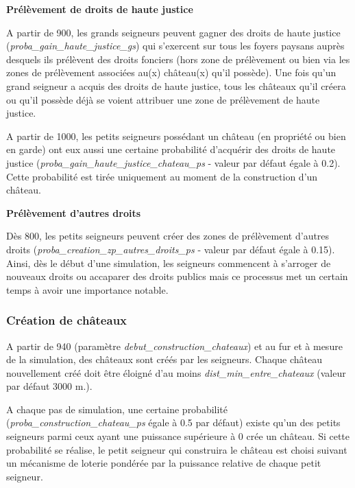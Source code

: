 \documentclass[a4paper,11pt]{article}
\begin{document}
{%

\bigskip
\textbf{Prélèvement de droits de haute justice}

A partir de 900, les grands seigneurs peuvent gagner des droits de haute justice (\textit{proba\_gain\_haute\_justice\_gs}) qui s'exercent sur tous les foyers paysans auprès desquels ils prélèvent des droits fonciers (hors zone de prélèvement ou bien via les zones de prélèvement associées au(x) château(x) qu'il possède). Une fois qu'un grand seigneur a acquis des droits de haute justice, tous les châteaux qu'il créera ou qu'il possède déjà se voient attribuer une zone de prélèvement de haute justice.

A partir de 1000, les petits seigneurs possédant un château (en propriété ou bien en garde) ont eux aussi une certaine probabilité d'acquérir des droits de haute justice (\textit{proba\_gain\_haute\_justice\_chateau\_ps} - valeur par défaut égale à 0.2). Cette probabilité est tirée uniquement au moment de la construction d'un château.

\bigskip
\textbf{Prélèvement d'autres droits}

Dès 800, les petits seigneurs peuvent créer des zones de prélèvement d'autres droits (\textit{proba\_creation\_zp\_autres\_droits\_ps} - valeur par défaut égale à 0.15). Ainsi, dès le début d'une simulation, les seigneurs commencent à s'arroger de nouveaux droits ou accaparer des droits publics mais ce processus met un certain temps à avoir une importance notable.


\subsubsection{Création de châteaux}

\begin{sloppypar}
A partir de 940 (paramètre \textit{debut\_construction\_chateaux}) et au fur et à mesure de la simulation, des châteaux sont créés par les seigneurs. Chaque château nouvellement créé doit être éloigné d'au moins \textit{dist\_min\_entre\_chateaux} (valeur par défaut 3000 m.).

\bigskip
A chaque pas de simulation, une certaine probabilité (\textit{proba\_construction\_chateau\_ps} égale à 0.5 par défaut) existe qu'un des petits seigneurs parmi ceux ayant une puissance supérieure à 0 crée un château. Si cette probabilité se réalise, le petit seigneur qui construira le château est choisi suivant un mécanisme de loterie pondérée par la puissance relative de chaque petit seigneur.
\end{sloppypar}

}
\end{document}
